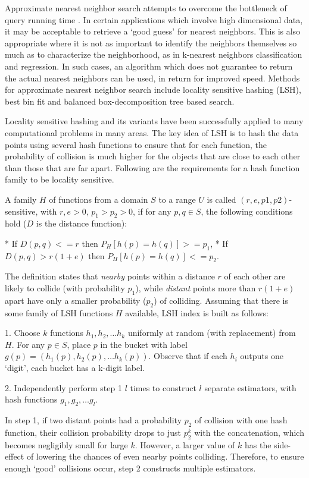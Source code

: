 \documentclass[twoside,11pt]{article}
\begin{document}
Approximate nearest neighbor search attempts to overcome the bottleneck
of query running time \citep{andoni2006near}. In certain applications which involve
high dimensional data, it may be acceptable to retrieve a `good guess' for
nearest neighbors. This is also appropriate where it is not as important to
identify the neighbors themselves so much as to characterize the neighborhood,
as in k-nearest neighbors classification and regression.
In such cases, an algorithm which does not guarantee to
return the actual nearest neighbors can be used, in return for improved speed.
Methods for approximate nearest neighbor search include locality
sensitive hashing (LSH), best bin fit and balanced box-decomposition tree based
search.

Locality sensitive hashing and its variants have been successfully
applied to many computational problems in many areas. The key idea of LSH is to
hash the data points using several hash functions to ensure that for each
function, the probability of collision is much higher for the objects that are
close to each other than those that are far apart. Following are the
requirements for a hash function family to be locality sensitive.

A family $H$ of functions from a domain $S$ to a range $U$
is called $(r, e , p1 , p2 )$-sensitive, with $r, e > 0$,
$p_1 > p_2 > 0$, if for any $p, q ∈ S$, the following conditions
hold ($D$ is the distance function):

* If $D(p,q) <= r$ then $P_H[h(p) = h(q)] >= p_1$,
* If $D(p,q) > r(1 + e)$ then $P_H[h(p) = h(q)] <= p_2$.

The definition states that \textit{nearby} points within a distance $r$ of
each other are likely to collide (with probability $p_1$), while 
\textit{distant} points more than $r(1 + e)$ apart have only a smaller
probability ($p_2$) of colliding. Assuming that there is some family
of LSH functions $H$ available, LSH index is built as follows:

1. Choose $k$ functions $h_1, h_2, … h_k$ uniformly at
   random (with replacement) from $H$. For any $p ∈ S$, place
   $p$ in the bucket with label
   $g(p) = (h_1(p), h_2(p), … h_k(p))$. Observe that if
   each $h_i$ outputs one `digit', each bucket has a k-digit label.

2. Independently perform step 1 $l$ times to construct $l$
   separate estimators, with hash functions $g_1, g_2, … g_l$.

In step 1, if two distant points had a probability $p_2$ of
collision with one hash function, their collision probability drops to
just $p_2^k$ with the concatenation, which becomes
negligibly small for large $k$. However, a larger value of $k$
has the side-effect of lowering the chances of even nearby points colliding.
Therefore, to ensure enough `good' collisions occur, step 2 constructs
multiple estimators.
\end{document}
